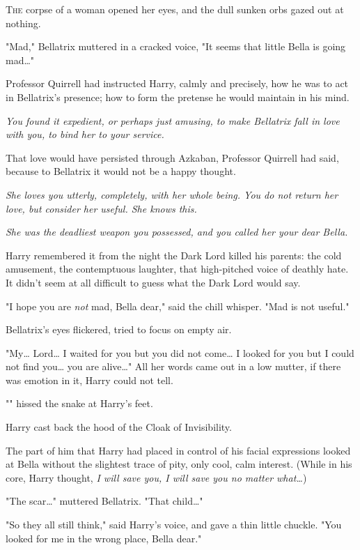 
\lettrine{T}{he} corpse of a 
woman opened her eyes, and the dull sunken orbs gazed out at nothing.

"Mad," Bellatrix muttered in a cracked voice, "It seems that little Bella is 
going mad{\ldots}"

Professor Quirrell had instructed Harry, calmly and precisely, how he was to 
act in Bellatrix's presence; how to form the pretense he would maintain in his 
mind.

\emph{You found it expedient, or perhaps just amusing, to make Bellatrix fall 
in love with you, to bind her to your service.}

That love would have persisted through Azkaban, Professor Quirrell had said, 
because to Bellatrix it would not be a happy thought.

\emph{She loves you utterly, completely, with her whole being. You do not 
return her love, but consider her useful. She knows this.}

\emph{She was the deadliest weapon you possessed, and you called her your dear 
Bella.}

Harry remembered it from the night the Dark Lord killed his parents: the cold 
amusement, the contemptuous laughter, that high-pitched voice of deathly hate. 
It didn't seem at all difficult to guess what the Dark Lord would say.

"I hope you are \emph{not} mad, Bella dear," said the chill whisper. "Mad is 
not useful."

Bellatrix's eyes flickered, tried to focus on empty air.

"My{\ldots} Lord{\ldots} I waited for you but you did not come{\ldots} I looked 
for you but I could not find you{\ldots} you are alive{\ldots}" All her words 
came out in a low mutter, if there was emotion in it, Harry could not tell.

"" hissed the snake at Harry's feet.

Harry cast back the hood of the Cloak of Invisibility.

The part of him that Harry had placed in control of his facial expressions 
looked at Bella without the slightest trace of pity, only cool, calm interest. 
(While in his core, Harry thought, \emph{I will save you, I will save you no 
matter what{\ldots}})

"The scar{\ldots}" muttered Bellatrix. "That child{\ldots}"

"So they all still think," said Harry's voice, and gave a thin little chuckle. 
"You looked for me in the wrong place, Bella dear."


